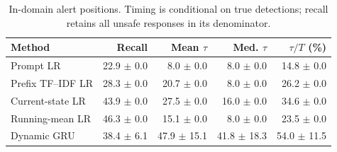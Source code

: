\begin{table}[t]
\centering\footnotesize
\caption{In-domain alert positions. Timing is conditional on true detections; recall retains all unsafe responses in its denominator.}\label{tab:alert_positions}
\begin{tabular}{lrrrr}\toprule
Method & Recall & Mean $\tau$ & Med. $\tau$ & $\tau/T$ (\%) \\
\midrule
Prompt LR & 22.9 $\pm$ 0.0 & 8.0 $\pm$ 0.0 & 8.0 $\pm$ 0.0 & 14.8 $\pm$ 0.0 \\
Prefix TF--IDF LR & 28.3 $\pm$ 0.0 & 20.7 $\pm$ 0.0 & 8.0 $\pm$ 0.0 & 26.2 $\pm$ 0.0 \\
Current-state LR & 43.9 $\pm$ 0.0 & 27.5 $\pm$ 0.0 & 16.0 $\pm$ 0.0 & 34.6 $\pm$ 0.0 \\
Running-mean LR & 46.3 $\pm$ 0.0 & 15.1 $\pm$ 0.0 & 8.0 $\pm$ 0.0 & 23.5 $\pm$ 0.0 \\
Dynamic GRU & 38.4 $\pm$ 6.1 & 47.9 $\pm$ 15.1 & 41.8 $\pm$ 18.3 & 54.0 $\pm$ 11.5 \\
\bottomrule\end{tabular}
\end{table}
